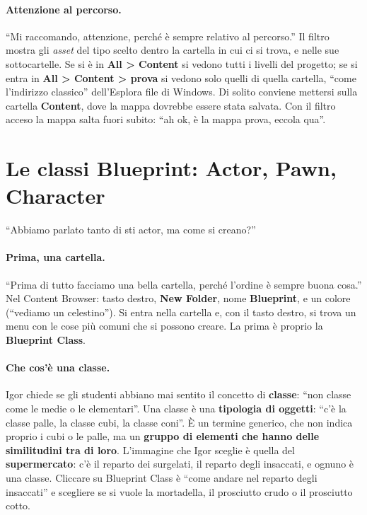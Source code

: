 \paragraph{Attenzione al percorso.} ``Mi raccomando, attenzione, perché è sempre
relativo al percorso.'' Il filtro mostra gli \emph{asset} del tipo scelto dentro la
cartella in cui ci si trova, e nelle sue sottocartelle. Se si è in \textbf{All
\textgreater{} Content} si vedono tutti i livelli del progetto; se si entra in
\textbf{All \textgreater{} Content \textgreater{} prova} si vedono solo quelli di
quella cartella, ``come l'indirizzo classico'' dell'Esplora file di Windows. Di solito
conviene mettersi sulla cartella \textbf{Content}, dove la mappa dovrebbe essere stata
salvata. Con il filtro acceso la mappa salta fuori subito: ``ah ok, è la mappa prova,
eccola qua''.

\section{Le classi Blueprint: Actor, Pawn, Character}
\label{ue2:sec:classi}

``Abbiamo parlato tanto di sti actor, ma come si creano?''

\paragraph{Prima, una cartella.} ``Prima di tutto facciamo una bella cartella, perché
l'ordine è sempre buona cosa.'' Nel Content Browser: tasto destro, \textbf{New Folder},
nome \textbf{Blueprint}, e un colore (``vediamo un celestino''). Si entra nella
cartella e, con il tasto destro, si trova un menu con le cose più comuni che si possono
creare. La prima è proprio la \textbf{Blueprint Class}.

\paragraph{Che cos'è una classe.} Igor chiede se gli studenti abbiano mai sentito il
concetto di \textbf{classe}: ``non classe come le medie o le elementari''. Una classe è
una \textbf{tipologia di oggetti}: ``c'è la classe palle, la classe cubi, la classe
coni''. È un termine generico, che non indica proprio i cubi o le palle, ma un
\textbf{gruppo di elementi che hanno delle similitudini tra di loro}. L'immagine che
Igor sceglie è quella del \textbf{supermercato}: c'è il reparto dei surgelati, il reparto
degli insaccati, e ognuno è una classe. Cliccare su Blueprint Class è ``come andare nel
reparto degli insaccati'' e scegliere se si vuole la mortadella, il prosciutto crudo o
il prosciutto cotto.

